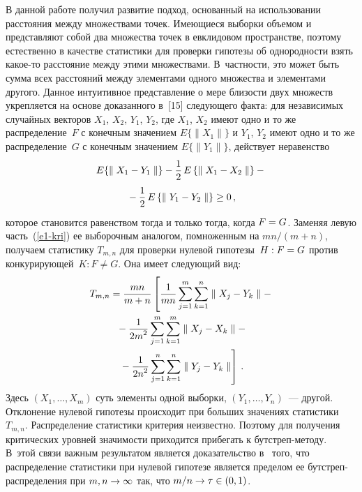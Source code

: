 \begin{multicols}{2}
      В данной работе получил развитие подход, основанный на использовании расстояния 
между множествами точек. Имеющиеся выборки объемом   и   представляют собой два 
множества точек в евклидовом пространстве, поэтому естественно в качестве статистики для 
проверки гипотезы об од\-но\-род\-ности взять ка\-кое-то расстояние между этими множествами. 
В~частности, это может быть сумма всех расстояний между элементами одного множества и 
элементами другого. Данное интуитивное пред\-став\-ле\-ние о мере близости двух множеств 
укрепляется на основе доказанного в~[15] сле\-ду\-юще\-го факта: для независимых случайных 
векторов $X_1$, $X_2$, $Y_1$, $Y_2$, где $X_1$, $X_2$ имеют одно и то же 
распределение~$F$ с конечным значением $E\{\parallel X_1\parallel\}$ и $Y_1$, $Y_2$ 
имеют одно и то же распределение~$G$ с конечным значением $E\{\parallel Y_1\parallel\}$, 
действует неравенство
      \begin{multline}
      E\{\parallel X_1-Y_1\parallel\}-\displaystyle\frac{\displaystyle 1\mathstrut}{\displaystyle 2\mathstrut}\,E\left\{ \parallel X_1-X_2\parallel\right\}-{}\\
      {}-
\displaystyle\frac{\displaystyle 1\mathstrut}{\displaystyle 2\mathstrut}\,E\left\{ \parallel Y_1-Y_2\parallel\right\}\geq 0\,,
      \label{e1-kri}
      \end{multline}
которое становится равенством тогда и только тогда, когда $F\hm=G$. Заменяя левую 
часть~(\ref{e1-kri}) ее выборочным аналогом, помноженным на $mn/(m+n)$, получаем 
статистику $T_{m,n}$ для проверки нулевой гипотезы~$H: F\hm=G$ против 
конку\-ри\-ру\-ющей~\mbox{$K: F\not= G$}. Она имеет следующий вид:
\begin{multline}
T_{m,n} =\displaystyle\frac{\displaystyle mn\mathstrut}{\displaystyle m+n\mathstrut}\left[ \displaystyle\frac{\displaystyle 1\mathstrut}{\displaystyle mn\mathstrut} \sum\limits_{j=1}^m \sum\limits_{k=1}^n \parallel 
X_j-Y_k\parallel -{}\right.\\
{}-\displaystyle\frac{\displaystyle 1\mathstrut}{\displaystyle 2m^2\mathstrut}\sum\limits_{j=1}^m \sum\limits_{k=1}^m \parallel X_j-
X_k\parallel - {}\\
\left.{}-\displaystyle\frac{\displaystyle 1\mathstrut}{\displaystyle 2n^2\mathstrut}\sum\limits_{j=1}^n \sum\limits_{k=1}^n \parallel Y_j-Y_k\parallel 
\right]\,.
\label{e2-kri}
\end{multline}
Здесь $(X_1,\ldots ,X_m)$ суть элементы одной выборки, $(Y_1,\ldots, Y_n)$~--- другой. 
Отклонение нулевой гипотезы происходит при больших значениях статистики~$T_{m,n}$. 
Распределение статистики критерия неизвестно. Поэтому для получения критических 
уровней значимости приходится прибегать к бут\-стреп-ме\-то\-ду. В~этой связи важным 
результатом является доказательство в~\cite{15-kri} того, что распределение статистики при 
нулевой гипотезе является пределом ее бут\-стреп-рас\-пре\-де\-ле\-ния при $m,n\hm\to 
\infty$ так, что $m/n\hm\to \tau\hm\in (0,1)$.


\end{multicols}
